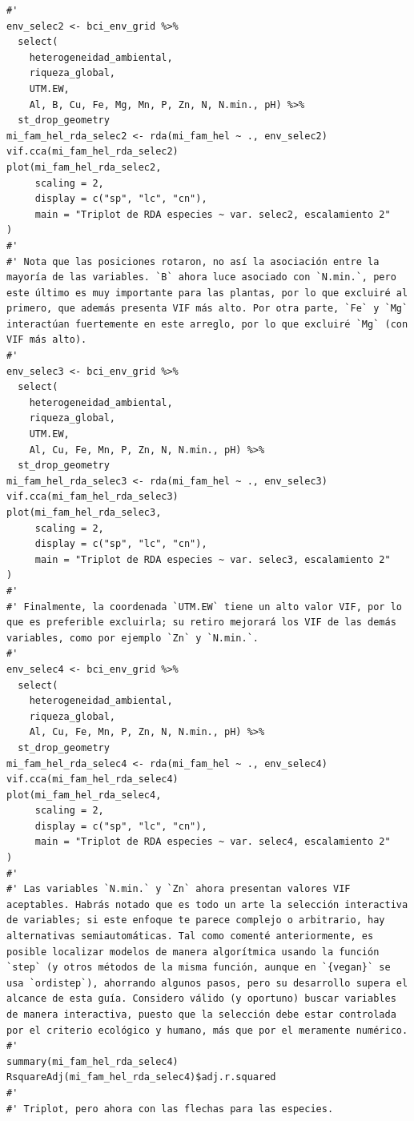 \documentclass[11pt,]{article}
\begin{document}
\begin{verbatim}
#' 
env_selec2 <- bci_env_grid %>%
  select(
    heterogeneidad_ambiental,
    riqueza_global,
    UTM.EW,
    Al, B, Cu, Fe, Mg, Mn, P, Zn, N, N.min., pH) %>% 
  st_drop_geometry
mi_fam_hel_rda_selec2 <- rda(mi_fam_hel ~ ., env_selec2)
vif.cca(mi_fam_hel_rda_selec2)
plot(mi_fam_hel_rda_selec2,
     scaling = 2,
     display = c("sp", "lc", "cn"),
     main = "Triplot de RDA especies ~ var. selec2, escalamiento 2"
)
#' 
#' Nota que las posiciones rotaron, no así la asociación entre la mayoría de las variables. `B` ahora luce asociado con `N.min.`, pero este último es muy importante para las plantas, por lo que excluiré al primero, que además presenta VIF más alto. Por otra parte, `Fe` y `Mg` interactúan fuertemente en este arreglo, por lo que excluiré `Mg` (con VIF más alto).
#' 
env_selec3 <- bci_env_grid %>%
  select(
    heterogeneidad_ambiental,
    riqueza_global,
    UTM.EW,
    Al, Cu, Fe, Mn, P, Zn, N, N.min., pH) %>% 
  st_drop_geometry
mi_fam_hel_rda_selec3 <- rda(mi_fam_hel ~ ., env_selec3)
vif.cca(mi_fam_hel_rda_selec3)
plot(mi_fam_hel_rda_selec3,
     scaling = 2,
     display = c("sp", "lc", "cn"),
     main = "Triplot de RDA especies ~ var. selec3, escalamiento 2"
)
#'
#' Finalmente, la coordenada `UTM.EW` tiene un alto valor VIF, por lo que es preferible excluirla; su retiro mejorará los VIF de las demás variables, como por ejemplo `Zn` y `N.min.`.
#' 
env_selec4 <- bci_env_grid %>%
  select(
    heterogeneidad_ambiental,
    riqueza_global,
    Al, Cu, Fe, Mn, P, Zn, N, N.min., pH) %>% 
  st_drop_geometry
mi_fam_hel_rda_selec4 <- rda(mi_fam_hel ~ ., env_selec4)
vif.cca(mi_fam_hel_rda_selec4)
plot(mi_fam_hel_rda_selec4,
     scaling = 2,
     display = c("sp", "lc", "cn"),
     main = "Triplot de RDA especies ~ var. selec4, escalamiento 2"
)
#' 
#' Las variables `N.min.` y `Zn` ahora presentan valores VIF aceptables. Habrás notado que es todo un arte la selección interactiva de variables; si este enfoque te parece complejo o arbitrario, hay alternativas semiautomáticas. Tal como comenté anteriormente, es posible localizar modelos de manera algorítmica usando la función `step` (y otros métodos de la misma función, aunque en `{vegan}` se usa `ordistep`), ahorrando algunos pasos, pero su desarrollo supera el alcance de esta guía. Considero válido (y oportuno) buscar variables de manera interactiva, puesto que la selección debe estar controlada por el criterio ecológico y humano, más que por el meramente numérico.
#'
summary(mi_fam_hel_rda_selec4)
RsquareAdj(mi_fam_hel_rda_selec4)$adj.r.squared
#' 
#' Triplot, pero ahora con las flechas para las especies.

\end{verbatim}
\end{document}
